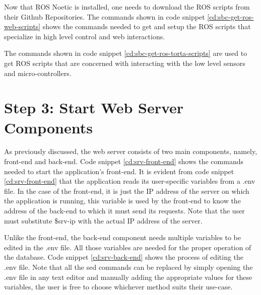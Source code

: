 \newpage


Now that ROS Noetic is installed, one needs to download the ROS scripts from their Github Repositories. The commands shown in code snippet \ref{cd:sbc-get-ros-web-scripts} shows the commands needed to get and setup the ROS scripts that specialize in high level control and web interactions.


The commands shown in code snippet \ref{cd:sbc-get-ros-torta-scripts} are used to get ROS scripts that are concerned with interacting with the low level sensors and micro-controllers.

\newpage
\section{Step 3: Start Web Server Components}
As previously discussed, the web server consists of two main components, namely, front-end and back-end. Code snippet \ref{cd:srv-front-end} shows the commands needed to start the application's front-end. It is evident from code snippet \ref{cd:srv-front-end} that the application reads its user-specific variables from a .env file. In the case of the front-end, it is just the IP address of the server on which the application is running, this variable is used by the front-end to know the address of the back-end to which it must send its requests. Note that the user must substitute \$srv-ip with the actual IP address of the server.



Unlike the front-end, the back-end component needs multiple variables to be edited in the .env file. All those variables are needed for the proper operation of the database. Code snippet \ref{cd:srv-back-end} shows the process of editing the .env file. Note that all the sed commands can be replaced by simply opening the .env file in any text editor and manually adding the appropriate values for these variables, the user is free to choose whichever method suits their use-case.


